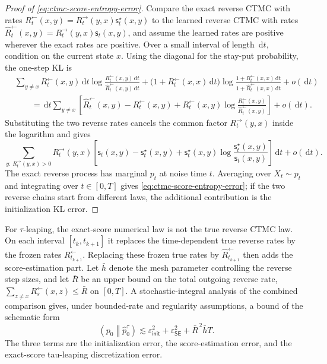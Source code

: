 \documentclass[10pt,a4paper]{amsart}
\numberwithin{equation}{section}
\DeclareMathOperator{\KL}{D_{\mathsf{KL}}}
\newcommand{\dd}{\,\mathrm{d}}
\newcommand{\wh}[1]{\widehat{#1}}
\newcommand{\sstar}{\mathsf{s}^{\star}}
\newcommand{\score}{\mathsf{s}}
\newcommand{\epsinit}{\varepsilon_{\mathsf{init}}}
\newcommand{\epsSE}{\varepsilon_{\mathsf{SE}}}
\begin{document}
\begin{proof}[Proof of \eqref{eq:ctmc-score-entropy-error}]
Compare the exact reverse CTMC with rates
$R_t^{\leftarrow}(x,y)=R_t^{\to}(y,x)\sstar_t(x,y)$ to the learned reverse CTMC
with rates
$\wh R_t^{\leftarrow}(x,y)=R_t^{\to}(y,x)\score_t(x,y)$, and assume the learned
rates are positive wherever the exact rates are positive.  Over a small interval
of length $\dd t$, condition on the current state $x$.  Using the diagonal for
the stay-put probability, the one-step KL is
\[
\begin{aligned}
    &\sum_{y\neq x}R_t^{\leftarrow}(x,y)\dd t
    \log
    \frac{R_t^{\leftarrow}(x,y)\dd t}
         {\wh R_t^{\leftarrow}(x,y)\dd t}
    +
    \bigl(1+R_t^{\leftarrow}(x,x)\dd t\bigr)
    \log
    \frac{1+R_t^{\leftarrow}(x,x)\dd t}
         {1+\wh R_t^{\leftarrow}(x,x)\dd t}
    +o(\dd t)  \\
    &\qquad=
    \dd t
    \sum_{y\neq x}
    \left[
    \wh R_t^{\leftarrow}(x,y)-R_t^{\leftarrow}(x,y)
    +R_t^{\leftarrow}(x,y)
    \log
    \frac{R_t^{\leftarrow}(x,y)}
         {\wh R_t^{\leftarrow}(x,y)}
    \right]
    +o(\dd t).
\end{aligned}
\]
Substituting the two reverse rates cancels the common factor
$R_t^{\to}(y,x)$ inside the logarithm and gives
\[
    \sum_{y:\,R_t^{\to}(y,x)>0}
    R_t^{\to}(y,x)
    \left[
    \score_t(x,y)-\sstar_t(x,y)
    +\sstar_t(x,y)\log\frac{\sstar_t(x,y)}{\score_t(x,y)}
    \right]\dd t
    +o(\dd t).
\]
The exact reverse process has marginal $p_t$ at noise time $t$.  Averaging over
$X_t\sim p_t$ and integrating over $t\in[0,T]$ gives
\eqref{eq:ctmc-score-entropy-error}; if the two reverse chains start from
different laws, the additional contribution is the initialization KL error.
\end{proof}

For $\tau$-leaping, the exact-score numerical law is not the true reverse CTMC
law.  On each interval $[t_k,t_{k+1}]$ it replaces the time-dependent true
reverse rates by the frozen rates $R_{t_{k+1}}^{\leftarrow}$.  Replacing these
frozen true rates by $\wh R_{t_{k+1}}^{\leftarrow}$ then adds the
score-estimation part.  Let $\bar h$ denote the mesh parameter controlling the
reverse step sizes, and let $\bar R$ be an upper bound on the total outgoing
reverse rate,
$\sum_{z\neq x}R_s^{\leftarrow}(x,z)\leq\bar R$ on $[0,T]$.  A
stochastic-integral analysis of the combined comparison gives, under
bounded-rate and regularity assumptions, a bound of the schematic form
\begin{equation}\label{eq:tau-leaping-kl-general}
    \KL\!\left(p_0\middle\|\wh p_0^\tau\right)
    \lesssim
    \epsinit^2
    +\epsSE^2
    +\bar R^{\,2}\bar h T.
\end{equation}
The three terms are the initialization error, the score-estimation error, and
the exact-score tau-leaping discretization error.
\end{document}
